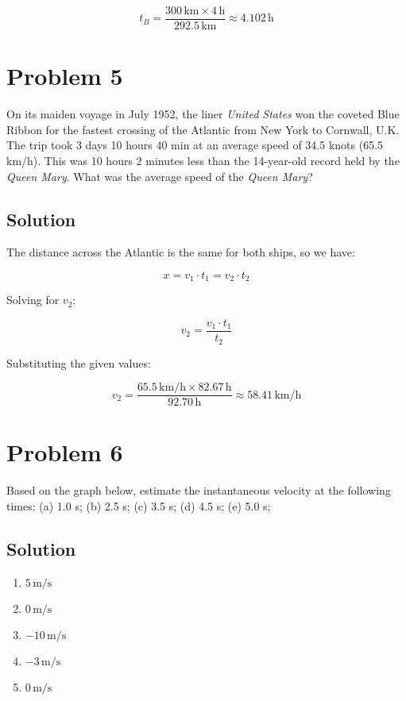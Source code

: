 \documentclass{article}
\newcommand{\kilo}{\text{k}}
\newcommand{\meter}{\text{m}}
\newcommand{\second}{\text{s}}
\begin{document}
\[
t_B = \frac{300 \, \si{\kilo\meter} \times 4 \, \si{\hour}}{292.5 \, \si{\kilo\meter}} \approx 4.102 \, \si{\hour}
\]

\section*{Problem 5}
On its maiden voyage in July 1952, the liner \textit{United States} won the coveted Blue Ribbon for
the fastest crossing of the Atlantic from New York to Cornwall, U.K. The trip took 3 days 10
hours 40 min at an average speed of 34.5 knots (65.5 km/h). This was 10 hours 2 minutes less than the
14-year-old record held by the \textit{Queen Mary}. What was the average speed of the \textit{Queen Mary}?

\subsection*{Solution}
The distance across the Atlantic is the same for both ships, so we have:

\[
x = v_1 \cdot t_1 = v_2 \cdot t_2
\]

Solving for \( v_2 \):

\[
v_2 = \frac{v_1 \cdot t_1}{t_2}
\]

Substituting the given values:

\[
v_2 = \frac{65.5 \, \si{\kilo\meter\per\hour} \times 82.67 \, \si{\hour}}{92.70 \, \si{\hour}} \approx 58.41 \, \si{\kilo\meter\per\hour}
\]

\section*{Problem 6}
Based on the graph below, estimate the instantaneous velocity at the following times: (a) 1.0 s; (b) 2.5 s; (c) 3.5 s; (d) 4.5 s; (e) 5.0 s;

\subsection*{Solution}

\begin{enumerate}[label=(\alph*)]
    \item \(5 \, \si{\meter\per\second}\)
    \item \(0 \, \si{\meter\per\second}\)
    \item \(-10 \, \si{\meter\per\second}\)
    \item \(-3 \, \si{\meter\per\second}\)
    \item \(0 \, \si{\meter\per\second}\)
\end{enumerate}
\end{document}
